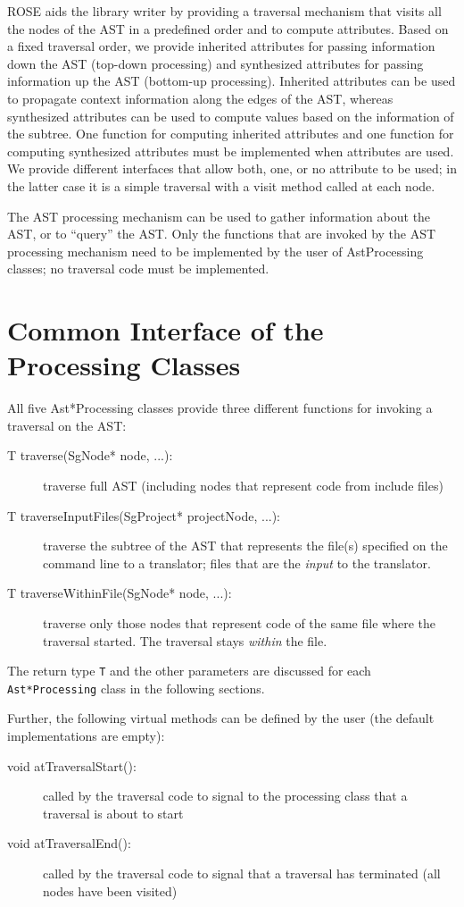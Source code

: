 ROSE aids the library writer by providing a traversal
mechanism that visits all the nodes of the AST in a predefined order
and to compute attributes.  Based on a fixed traversal order, we
provide inherited attributes for passing information down the AST (top-down processing) and synthesized attributes for passing information up
the AST (bottom-up processing). Inherited attributes can be used to
propagate context information along the edges of the AST, whereas
synthesized attributes can be used to compute values based on the
information of the subtree.  One function for computing inherited
attributes and one function for computing synthesized attributes must
be implemented when attributes are used.  We provide different
interfaces that allow both, one, or no attribute to be used; in
the latter case it is a simple traversal with a visit method called at
each node.

The AST processing mechanism can be used to gather information
about the AST, or to ``query'' the AST. Only the functions that are
invoked by the AST processing mechanism need to be implemented by the user
of AstProcessing classes; no traversal code must be implemented.

\section{Common Interface of the Processing Classes}

All five Ast*Processing classes provide three different functions for invoking a traversal on the AST:

\begin{description}
\item[T traverse(SgNode* node, ...):] traverse full AST (including nodes that represent code from include files)
\item[T traverseInputFiles(SgProject* projectNode, ...):] traverse the subtree of the AST
    that represents the file(s) specified on the command line to a translator; files that
    are the {\em input} to the translator.
\item[T traverseWithinFile(SgNode* node, ...):] traverse only those nodes that represent 
code of the same file where the traversal started. The traversal stays {\em within} the file.
\end{description}

The return type {\tt T} and the other parameters are discussed for each {\tt Ast*Processing} class in the following sections.

Further, the following virtual methods can be defined by the user (the default
implementations are empty):
\begin{description}
\item[void atTraversalStart():] called by the traversal code to signal to the
processing class that a traversal is about to start
\item[void atTraversalEnd():] called by the traversal code to signal that a
traversal has terminated (all nodes have been visited)
\end{description}

